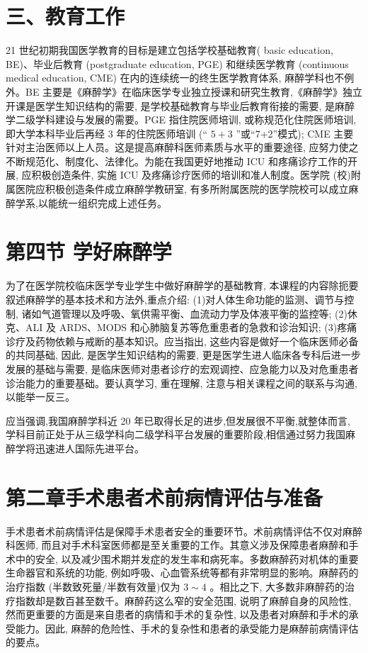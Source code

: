 \documentclass[10pt]{article}
\begin{document}
\section*{三、教育工作}
21 世纪初期我国医学教育的目标是建立包括学校基础教育( basic education, BE)、毕业后教育 (postgraduate education, PGE) 和继续医学教育 (continuous medical education, CME) 在内的连续统一的终生医学教育体系, 麻醉学科也不例外。BE 主要是《麻醉学》在临床医学专业独立授课和研究生教育,《麻醉学》独立开课是医学生知识结构的需要, 是学校基础教育与毕业后教育衔接的需要, 是麻醉学二级学科建设与发展的需要。PGE 指住院医师培训, 或称规范化住院医师培训,即大学本科毕业后再经 3 年的住院医师培训 (“ $5+3$ ”或“7+2”模式); CME 主要针对主治医师以上人员。这是提高麻醉科医师素质与水平的重要途径, 应努力使之不断规范化、制度化、法律化。为能在我国更好地推动 ICU 和疼痛诊疗工作的开展, 应积极创造条件, 实施 ICU 及疼痛诊疗医师的培训和准人制度。医学院 (校)附属医院应积极创造条件成立麻醉学教研室, 有多所附属医院的医学院校可以成立麻醉学系,以能统一组织完成上述任务。

\section*{第四节 学好麻醉学}
为了在医学院校临床医学专业学生中做好麻醉学的基础教育, 本课程的内容除扼要叙述麻醉学的基本技术和方法外,重点介绍: (1)对人体生命功能的监测、调节与控制, 诸如气道管理以及呼吸、氧供需平衡、血流动力学及体液平衡的监控等; (2)休克、ALI 及 ARDS、MODS 和心肺脑复苏等危重患者的急救和诊治知识; (3)疼痛诊疗及药物依赖与戒断的基本知识。应当指出, 这些内容是做好一个临床医师必备的共同基础, 因此, 是医学生知识结构的需要, 更是医学生进人临床各专科后进一步发展的基础与需要, 是临床医师对患者诊疗的宏观调控、应急能力以及对危重患者诊治能力的重要基础。要认真学习, 重在理解, 注意与相关课程之间的联系与沟通, 以能举一反三。

应当强调,我国麻醉学科近 20 年已取得长足的进步,但发展很不平衡,就整体而言, 学科目前正处于从三级学科向二级学科平台发展的重要阶段,相信通过努力我国麻醉学将迅速进人国际先进平台。

\section*{第二章手术患者术前病情评估与准备}
手术患者术前病情评估是保障手术患者安全的重要环节。术前病情评估不仅对麻醉科医师, 而且对手术科室医师都是至关重要的工作。其意义涉及保障患者麻醉和手术中的安全, 以及减少围术期并发症的发生率和病死率。多数麻醉药对机体的重要生命器官和系统的功能, 例如呼吸、心血管系统等都有非常明显的影响。麻醉药的治疗指数 (半数致死量/半数有效量)仅为 $3 \sim 4$ 。相比之下, 大多数非麻醉药的治疗指数却是数百甚至数千。麻醉药这么窄的安全范围, 说明了麻醉自身的风险性, 然而更重要的方面是来自患者的病情和手术的复杂性, 以及患者对麻醉和手术的承受能力。因此, 麻醉的危险性、手术的复杂性和患者的承受能力是麻醉前病情评估的要点。
\end{document}
